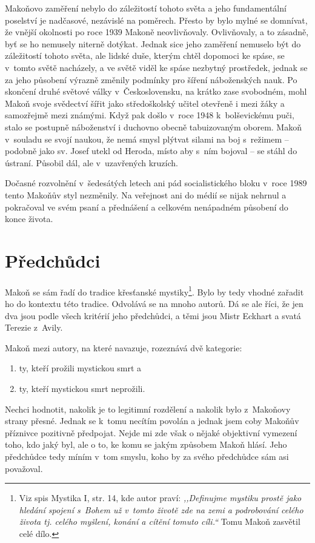 Makoňovo zaměření nebylo do záležitostí tohoto světa a jeho fundamentální
poselství je nadčasové, nezávislé na poměrech. Přesto by bylo mylné se domnívat,
že vnější okolnosti po roce 1939 Makoně neovlivňovaly. Ovlivňovaly, a to
zásadně, byť se ho nemusely niterně dotýkat. Jednak sice jeho zaměření nemuselo
být do záležitostí tohoto světa, ale lidské duše, kterým chtěl dopomoci ke
spáse, se v~tomto světě nacházely, a ve světě viděl ke spáse nezbytný
prostředek, jednak se za jeho působení výrazně změnily podmínky pro šíření
náboženských nauk\cite{nevspor2007vceska}. Po skončení druhé světové války v~Československu, na krátko
zase svobodném, mohl Makoň svoje svědectví šířit jako středoškolský učitel
otevřeně i mezi žáky a samozřejmě mezi známými. Když pak došlo v~roce 1948
k~bolševickému puči, stalo se postupně náboženství i duchovno obecně
tabuizovaným oborem\cite{kaplan1993stat}. Makoň v~souladu se svojí naukou, že nemá smysl plýtvat
silami na boj s~režimem -- podobně jako sv. Josef utekl od Heroda, místo aby
s~ním bojoval -- se stáhl do ústraní. Působil dál, ale v~uzavřených kruzích.

Dočasné rozvolnění v~šedesátých letech ani pád socialistického bloku v~roce 1989
tento Makoňův styl nezměnily. Na veřejnost ani do médií se nijak nehrnul a
pokračoval ve svém psaní a přednášení a celkovém nenápadném působení do konce
života.

\section{Předchůdci}

Makoň se sám řadí do tradice křesťanské mystiky\footnote{Viz spis Mystika I,
str. 14, kde autor praví: \textit{,,Definujme mystiku prostě
jako hledání spojení s~Bohem už v~tomto životě zde na zemi a
podrobování celého života tj. celého myšlení, konání a cítění
tomuto cíli.``} Tomu Makoň zasvětil celé dílo.}. Bylo by tedy vhodné zařadit ho
do kontextu této tradice. Odvolává se na mnoho autorů. Dá se ale říci, že jen
dva jsou podle všech kritérií jeho předchůdci, a těmi jsou Mistr Eckhart a svatá
Terezie z~Avily.

Makoň mezi autory, na které navazuje, rozeznává dvě kategorie:
\begin{enumerate}
\item{ty, kteří prožili mystickou smrt a}
\item{ty, kteří mystickou smrt neprožili.}
\end{enumerate}
Nechci hodnotit, nakolik je to legitimní rozdělení a nakolik bylo
z~Makoňovy strany přesné. Jednak se k~tomu necítím povolán a jednak jsem coby
Makoňův příznivce pozitivně předpojat. Nejde mi zde však o nějaké objektivní
vymezení toho, kdo jaký byl, ale o to, ke komu se jakým způsobem Makoň hlásí.
Jeho předchůdce tedy míním v~tom smyslu, koho by za svého předchůdce sám asi
považoval.

